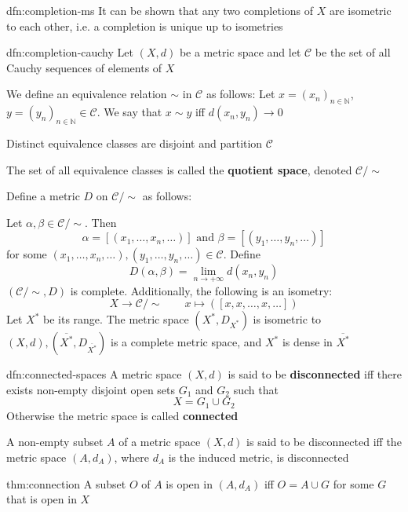 \documentclass[landscape, 8pt]{extarticle}
\begin{document}
\begin{multicols}{3}
\begin{dfn}{dfn:completion-ms}{}
    It can be shown that any two completions of $X$ are isometric to each other, i.e. a completion is unique up to isometries
\end{dfn}


\begin{dfn}{dfn:completion-cauchy}{}
    Let $(X, d)$ be a metric space and let $\mathcal{C}$ be the set of all Cauchy sequences of elements of $X$

    We define an equivalence relation $\sim$ in $\mathcal{C}$ as follows: Let $x = (x_{n})_{n\in \mathbb{N}}$, $y=(y_{n})_{n\in \mathbb{N}}\in \mathcal{C}$. We say that $x \sim y$ iff $d(x_{n}, y_{n})\to 0$

    Distinct equivalence classes are disjoint and partition $\mathcal{C}$

    The set of all equivalence classes is called the \textbf{quotient space}, denoted $\mathcal{C} / \sim$
    
    \longrule{0.08ex}
    Define a metric $D$ on $\mathcal{C} / \sim$ as follows:

    Let $\alpha, \beta\in \mathcal{C} /\sim$. Then 
    \[\alpha = [(x_{1},\dots,x_{n},\dots)] \text{ and } \beta = [(y_{1},\dots,y_{n},\dots)]\]
    for some $(x_{1},\dots,x_{n},\dots), (y_{1},\dots,y_{n},\dots)\in \mathcal{C}$. Define
    \[D(\alpha, \beta) = \lim_{n\to +\infty} d(x_{n}, y_{n})\]
    $(\mathcal{C} / \sim, D)$ is complete. Additionally, the following is an isometry:
    \[X \to \mathcal{C} / \sim \qquad x \mapsto ([x,x,\dots,x,\dots])\]
    Let $X^{*}$ be its range. The metric space $(X^{*}, D_{X^{*}})$ is isometric to $(X, d), (\overline{X^{*}}, D_{\overline{X^{*}}})$ is a complete metric space, and $X^{*}$ is dense in $\overline{X^{*}}$
\end{dfn}

\newpage
\begin{dfn}{dfn:connected-spaces}{}
    A metric space $(X, d)$ is said to be \textbf{disconnected} iff there exists non-empty disjoint open sets $G_{1}$ and $G_{2}$ such that
    \[X = G_{1} \cup G_{2}\]
    Otherwise the metric space is called \textbf{connected}

    \longrule{0.08ex}
    A non-empty subset $A$ of a metric space $(X, d)$ is said to be disconnected iff the metric space $(A, d_{A})$, where $d_{A}$ is the induced metric, is disconnected
\end{dfn}

\begin{thm}{thm:connection}{}
    A subset $O$ of $A$ is open in $(A, d_{A})$ iff $O = A \cup G$ for some $G$ that is open in $X$ %


\end{thm}
\end{multicols}
\end{document}

